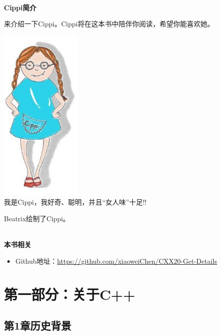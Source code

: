 \documentclass[11pt,a4paper,UTF8]{book}
\begin{document}
\begin{sloppypar}
  \hspace*{\fill} \\ %
  \noindent\textbf{Cippi简介}
  
  来介绍一下Cippi。Cippi将在这本书中陪伴你阅读，希望你能喜欢她。
  
  \begin{center}
  \includegraphics[width=0.3\textwidth]{content/Cippi.png}\\
  我是Cippi，我好奇、聪明，并且“女人味”十足!!
  \end{center}
  
  Beatrix绘制了Cippi。
  
  \hspace*{\fill} \\ %
  \noindent\textbf{本书相关}
  \begin{itemize}
  \item Github地址：\url{https://github.com/xiaoweiChen/CXX20-Get-Details}
  \end{itemize}
  \newpage
  
  \pagestyle{empty}
  
  \tableofcontents
  \newpage

  
  \color{white}
  \section*{第一部分：关于C++}
  \pagecolor{mygray}
  \textbf{}
  \newpage
  \color{black}
  \pagecolor{white}

  \subsection*{ 第1章\hspace{0.5cm}历史背景}
  
  

\end{sloppypar}
\end{document}
